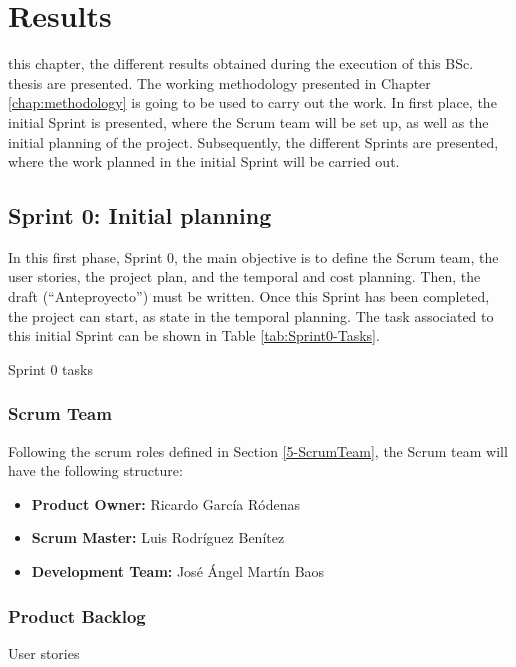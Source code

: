 \chapter{Results} %
\label{chap:results}

 this chapter, the different results obtained during the execution of this \ac{BSc.} thesis are presented. The working methodology presented in Chapter \ref{chap:methodology} is going to be used to carry out the work. In first place, the initial Sprint is presented, where the Scrum team will be set up, as well as the initial planning of the project. Subsequently, the different Sprints are presented, where the work planned in the initial Sprint will be carried out.




\section{Sprint 0: Initial planning}
\label{Section:Sprint0}
In this first phase, Sprint 0, the main objective is to define the Scrum team, the user stories, the project plan, and the temporal and cost planning. Then, the draft (“Anteproyecto”) must be written. Once this Sprint has been completed, the project can start, as state in the temporal planning. The task associated to this initial Sprint can be shown in Table \ref{tab:Sprint0-Tasks}.

\begin{table}[hp]
	\centering
	{\small
		
	}
	\caption{Sprint 0 tasks}
	\label{tab:Sprint0-Tasks}
\end{table}

\subsection{Scrum Team}
Following the scrum roles defined in Section \ref{5-ScrumTeam}, the Scrum team will have the following structure:
\begin{itemize}
	\item \textbf{Product Owner:} Ricardo García Ródenas
	\item \textbf{Scrum Master:} Luis Rodríguez Benítez
	\item \textbf{Development Team:} José Ángel Martín Baos
\end{itemize}

\subsection{Product Backlog}
\begin{table}[hp]
	\centering
	{\small
		
	}
	\caption{User stories}
	\label{tab:User-Stories}
\end{table}
	
